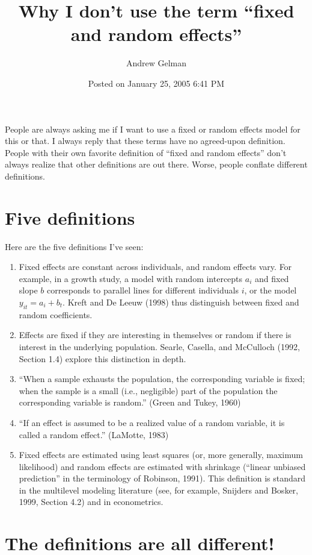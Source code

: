 \documentclass[stu,11pt]{apa7}
\title{Why I don't use the term ``fixed and random effects''}
\author{Andrew Gelman}
\date{Posted on January 25, 2005 6:41 PM}
\begin{document}
\maketitle

\setcounter{page}{1}

People are always asking me if I want to use a fixed or random effects model for this or that. I always reply that these terms have no agreed-upon definition. People with their own favorite definition of ``fixed and random effects'' don't always realize that other definitions are out there. Worse, people conflate different definitions.

\section{Five definitions}

Here are the five definitions I've seen:

\begin{enumerate}
    \item Fixed effects are constant across individuals, and random effects vary. For example, in a growth study, a model with random intercepts $a_i$ and fixed slope $b$ corresponds to parallel lines for different individuals $i$, or the model $y_{it} = a_i + b_t$. Kreft and De Leeuw (1998) thus distinguish between fixed and random coefficients.
    \item Effects are fixed if they are interesting in themselves or random if there is interest in the underlying population. Searle, Casella, and McCulloch (1992, Section 1.4) explore this distinction in depth.
    \item ``When a sample exhausts the population, the corresponding variable is fixed; when the sample is a small (i.e., negligible) part of the population the corresponding variable is random.'' (Green and Tukey, 1960)
    \item ``If an effect is assumed to be a realized value of a random variable, it is called a random effect.'' (LaMotte, 1983)
    \item Fixed effects are estimated using least squares (or, more generally, maximum likelihood) and random effects are estimated with shrinkage (``linear unbiased prediction'' in the terminology of Robinson, 1991). This definition is standard in the multilevel modeling literature (see, for example, Snijders and Bosker, 1999, Section 4.2) and in econometrics.
\end{enumerate}

\section{The definitions are all different!}
\end{document}

